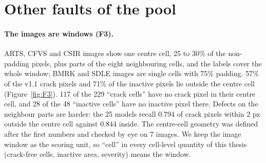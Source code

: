 
\section{Other faults of the pool}\label{sec:data-other}

\paragraph{The images are windows (F3).} ARTS, CFVS and CSIR images show one centre cell, 25 to 30\% of the non-padding pixels, plus
parts of the eight neighbouring cells, and the labels cover the whole window; BMRK and SDLE images are single cells with 75\%
padding. 57\% of the v1.1 crack pixels and 71\% of the inactive pixels lie outside the centre cell (Figure~\ref{fig:F3}). 117 of the 229 ``crack cells''
have no crack pixel in their centre cell, and 28 of the 48 ``inactive cells'' have no inactive pixel there. Defects on the
neighbour parts are harder: the 25 models recall 0.794 of crack pixels within 2 px outside the centre cell against 0.844 inside.
The centre-cell geometry was defined after the first numbers and checked by eye on 7 images. We keep the image window as the
scoring unit, so ``cell'' in every cell-level quantity of this thesis (crack-free cells, inactive area, severity) means the window.


